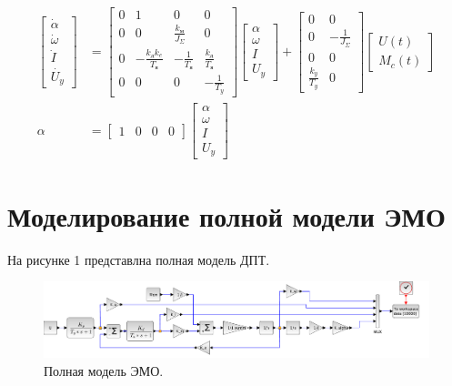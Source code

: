 \documentclass[a4paper, 11pt]{article}
\begin{document}
\begin{align}
    \begin{bmatrix}
        \dot{\alpha} \\
        \dot{\omega} \\
        \dot{I} \\
        \dot{U_y} 
    \end{bmatrix} & = 
    \begin{bmatrix}
        0 & 1 & 0 & 0 \\
        0 & 0 & \frac{k_\text{м}}{J_\Sigma} & 0 \\
        0 & -\frac{k_\text{д}k_e}{T_\text{я}} & - \frac{1}{T_\text{я}} & \frac{k_\text{д}}{T_\text{я}} \\
        0 & 0 & 0 & -\frac{1}{T_y}
    \end{bmatrix}
    \begin{bmatrix}
        \alpha \\
        \omega \\
        I \\
        U_y 
    \end{bmatrix} + 
    \begin{bmatrix}
        0 & 0 \\
        0 & - \frac{1}{J_\Sigma} \\
        0 & 0 \\
        \frac{k_y}{T_y} & 0
    \end{bmatrix}
    \begin{bmatrix}
        U(t) \\
        M_c(t)
    \end{bmatrix} \\
    \alpha & = 
    \begin{bmatrix}
        1 & 0 & 0 & 0
    \end{bmatrix}
    \begin{bmatrix}
        \alpha \\
        \omega \\
        I \\
        U_y 
    \end{bmatrix}
\end{align}

\section*{Моделирование полной модели ЭМО}

На рисунке 1 представлна полная модель ДПТ.
\begin{figure}[h!]
    \centering
    \includegraphics[width = \textwidth]{../images/FullModel/full-model.pdf}
    \caption{Полная модель ЭМО.}
\end{figure}
\end{document}
